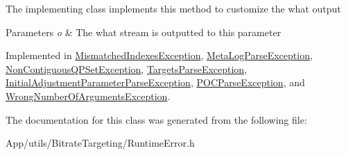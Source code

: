 The implementing class implements this method to customize the what output 
\begin{DoxyParams}{Parameters}
{\em o} & The what stream is outputted to this parameter \\
\hline
\end{DoxyParams}


Implemented in \hyperlink{class_mismatched_indexes_exception_a139455007e7a5bb092650d4f2929068a}{Mismatched\+Indexes\+Exception}, \hyperlink{class_meta_log_parse_exception_a18d40347b5a6eeef08b2c0d51a248898}{Meta\+Log\+Parse\+Exception}, \hyperlink{class_non_contiguous_q_p_set_exception_a0b3c362380db281c07b3c8a016a73c32}{Non\+Contiguous\+Q\+P\+Set\+Exception}, \hyperlink{class_targets_parse_exception_a8a1d505082502689960f60572ca4238a}{Targets\+Parse\+Exception}, \hyperlink{class_initial_adjustment_parameter_parse_exception_a4ca2931ba18ec5cecb76b7891aa9d2eb}{Initial\+Adjustment\+Parameter\+Parse\+Exception}, \hyperlink{class_p_o_c_parse_exception_a10ddedc5f13b259d4eeda78273e2ad4a}{P\+O\+C\+Parse\+Exception}, and \hyperlink{class_wrong_number_of_arguments_exception_aea3df412ea5cb97aa284b258021532c2}{Wrong\+Number\+Of\+Arguments\+Exception}.



The documentation for this class was generated from the following file\+:\begin{DoxyCompactItemize}
\item 
App/utils/\+Bitrate\+Targeting/Runtime\+Error.\+h\end{DoxyCompactItemize}
